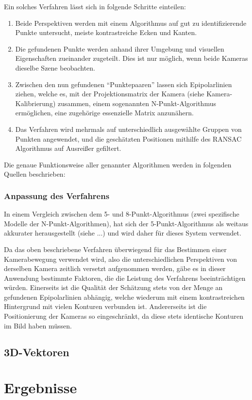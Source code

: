 \documentclass[12pt, ngerman]{article}
\begin{document}
Ein solches Verfahren lässt sich in folgende Schritte einteilen:

\begin{enumerate}
  \item Beide Perspektiven werden mit einem Algorithmus auf gut zu identifizierende Punkte untersucht, meiste kontrastreiche Ecken und Kanten.
  \item Die gefundenen Punkte werden anhand ihrer Umgebung und visuellen Eigenschaften zueinander zugeteilt. Dies ist nur möglich, wenn beide Kameras dieselbe Szene beobachten.
  \item Zwischen den nun gefundenen ``Punktepaaren'' lassen sich
  Epipolarlinien ziehen, welche es, mit der Projektionsmatrix der Kamera (siehe
  Kamera-Kalibrierung) zusammen, einem sogenannten N-Punkt-Algorithmus
  ermöglichen, eine zugehörige essenzielle Matrix anzunähern.
  \item Das Verfahren wird mehrmals auf unterschiedlich ausgewählte Gruppen
  von Punkten angewendet, und die geschätzten Positionen mithilfe des RANSAC
  Algorithmus auf Ausreißer gefiltert.
\end{enumerate}

Die genaue Funktionsweise aller genannter Algorithmen werden in folgenden Quellen beschrieben: 

\subsubsection{Anpassung des Verfahrens}
In einem Vergleich zwischen dem 5- und 8-Punkt-Algorithmus (zwei spezifische Modelle der N-Punkt-Algorithmen), hat sich der 5-Punkt-Algorithmus als weitaus akkurater herausgestellt (siehe ...) und wird daher für dieses System verwendet.

Da das oben beschriebene Verfahren überwiegend für das Bestimmen einer Kamerabewegung verwendet wird, also die unterschiedlichen Perspektiven von derselben Kamera zeitlich versetzt aufgenommen werden, gäbe es in dieser Anwendung bestimmte Faktoren, die die Leistung des Verfahrens beeinträchtigen würden.
Einerseits ist die Qualität der Schätzung stets von der Menge an gefundenen Epipolarlinien abhängig, welche wiederum mit einem kontrastreichen Hintergrund mit vielen Konturen verbunden ist. Andererseits ist die Positionierung der Kameras so eingeschränkt, da diese stets identische Konturen im Bild haben müssen.  





\subsection{3D-Vektoren}

\section{Ergebnisse}

\newpage
\nocite{*}
{}
 
\end{document}
